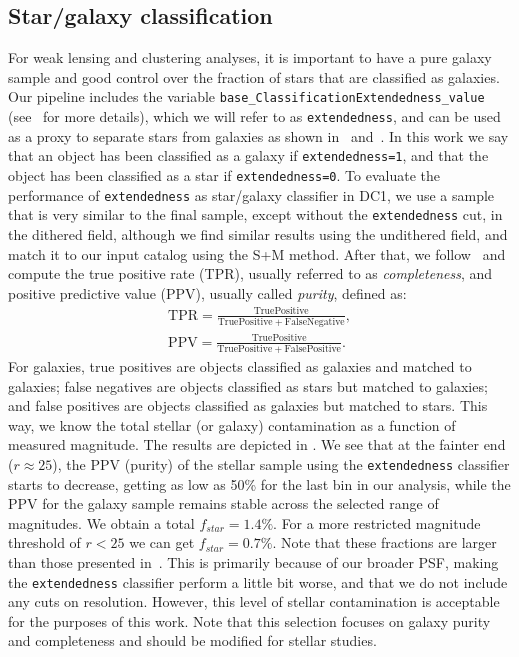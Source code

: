 \documentclass[\docopts]{\docclass}
\begin{document}
\subsection{Star/galaxy classification}
\label{sec:sg_sep}
For weak lensing and clustering analyses, it is important to have a pure galaxy sample and good control over the fraction of stars that are classified as galaxies. Our pipeline includes the variable \texttt{base\_ClassificationExtendedness\_value} (see~\citet{2018PASJ...70S...5B} for more details), which we will refer to as \texttt{extendedness}, and can be used as a proxy to separate stars from galaxies as shown in~\citet{2018PASJ...70S..25M} and~\citet{2018PASJ...70S...5B}. In this work we say that an object has been classified as a galaxy if \texttt{extendedness=1}, and that the object has been classified as a star if \texttt{extendedness=0}. To evaluate the performance of \texttt{extendedness} as star/galaxy classifier in DC1, we use a sample that is very similar to the final sample, except without the \texttt{extendedness} cut, in the dithered field, although we find similar results using the undithered field, and match it to our input catalog using the \textsf{S+M} method. After that, we follow~\citet{2018MNRAS.481.5451S} and compute the true positive rate (TPR), usually referred to as \textit{completeness}, and positive predictive value (PPV), usually called \textit{purity}, defined as:
\begin{eqnarray}
\mathrm{TPR} = \frac{\mathrm{True Positive}}{\mathrm{True Positive}+\mathrm{False Negative}}, \\
\mathrm{PPV} = \frac{\mathrm{True Positive}}{\mathrm{True Positive}+\mathrm{False Positive}}.
\end{eqnarray}
For galaxies, true positives are objects classified as galaxies and matched to galaxies; false negatives are objects classified as stars but matched to galaxies; and false positives are objects classified as galaxies but matched to stars. This way, we know the total stellar (or galaxy) contamination as a function of measured magnitude. The results are depicted in . We see that at the fainter end ($r \approx 25$), the PPV (purity) of the stellar sample using the \texttt{extendedness} classifier starts to decrease, getting as low as 50\% for the last bin in our analysis, while the PPV for the galaxy sample remains stable across the selected range of magnitudes. We obtain a total $f_{star}=1.4\%$. For a more restricted magnitude threshold of $r < 25$ we can get $f_{star} = 0.7\%$. Note that these fractions are larger than those presented in~\citet{2018PASJ...70S...5B}. This is primarily because of our broader PSF, making the \texttt{extendedness} classifier perform a little bit worse, and that we do not include any cuts on resolution. However, this level of stellar contamination is acceptable for the purposes of this work. Note that this selection focuses on galaxy purity and completeness and should be modified for stellar studies.
\end{document}
